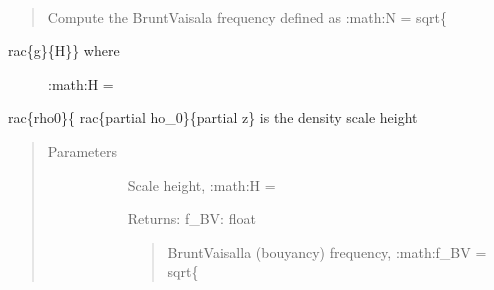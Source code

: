 \documentclass[letterpaper,10pt,english]{sphinxmanual}
\begin{document}
\begin{fulllineitems}
\label{\detokenize{stochprop.gravity:stochprop.gravity_waves.BV_freq}}~\begin{quote}

\sphinxAtStartPar
Compute the Brunt\sphinxhyphen{}Vaisala frequency defined as :math:{\color{red}\bfseries{}\textasciigrave{}}N = sqrt\{
\end{quote}
\begin{description}
\item[{rac\{g\}\{H\}\}\textasciigrave{} where }] \leavevmode
\sphinxAtStartPar
:math:{\color{red}\bfseries{}\textasciigrave{}}H =

\end{description}

\sphinxAtStartPar
rac\{rho0\}\{
rac\{partial 
ho\_0\}\{partial z\}\textasciigrave{} is the density scale height
\begin{quote}\begin{description}
\item[{Parameters}] \leavevmode\begin{description}
\item[{}] \leavevmode
\sphinxAtStartPar
Scale height, :math:{\color{red}\bfseries{}\textasciigrave{}}H =

\item[{}] \leavevmode
\item[{}] \leavevmode
\item[{}] \leavevmode
\item[{}] \leavevmode
\sphinxAtStartPar
Returns:
f\_BV: float
\begin{quote}

\sphinxAtStartPar
Brunt\sphinxhyphen{}Vaisalla (bouyancy) frequency, :math:{\color{red}\bfseries{}\textasciigrave{}}f\_BV = sqrt\{
\end{quote}

\item[{}] \leavevmode
\end{description}

\end{description}\end{quote}

\end{fulllineitems}
\end{document}
